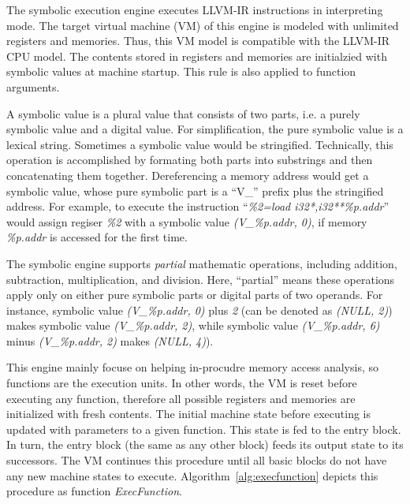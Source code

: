 The symbolic execution engine executes LLVM-IR instructions in interpreting mode.
The target virtual machine (VM) of this engine is modeled with unlimited registers and memories.
Thus, this VM model is compatible with the LLVM-IR CPU model.
The contents stored in registers and memories are initialzied with symbolic values at machine startup.
This rule is also applied to function arguments.

A symbolic value is a plural value that consists of two parts, i.e. a purely symbolic value and a digital value.
For simplification, the pure symbolic value is a lexical string.
Sometimes a symbolic value would be stringified.
Technically, this operation is accomplished by formating both parts into substrings and then concatenating them together.
Dereferencing a memory address would get a symbolic value, whose pure symbolic part is a ``V\_'' prefix plus the stringified address.
For example, to execute the instruction
``\textit{\%2=load i32*,i32**\%p.addr}'' would assign regiser \textit{\%2} with a symbolic value \textit{(V\_\%p.addr, 0)},
if memory \textit{\%p.addr} is accessed for the first time.

The symbolic engine supports \textit{partial} mathematic operations, including addition, subtraction, multiplication, and division.
Here, ``partial'' means these operations apply only on either pure symbolic parts or digital parts of two operands.
For instance, symbolic value \textit{(V\_\%p.addr, 0)} plus \textit{2} (can be denoted as \textit{(NULL, 2)}) makes symbolic value \textit{(V\_\%p.addr, 2)},
while symbolic value \textit{(V\_\%p.addr, 6)} minus \textit{(V\_\%p.addr, 2)} makes \textit{(NULL, 4)}).

This engine mainly focuse on helping in-procudre memory access analysis,
so functions are the execution units.
In other words, the VM is reset before executing any function, therefore all possible registers and memories are initialized with fresh contents.
The initial machine state before executing is updated with parameters to a given function.
This state is fed to the entry block.
In turn, the entry block (the same as any other block) feeds its output state to its successors.
The VM continues this procedure until all basic blocks do not have any new machine states to execute.
Algorithm~\ref{alg:execfunction} depicts this procedure as function \textit{ExecFunction}.

